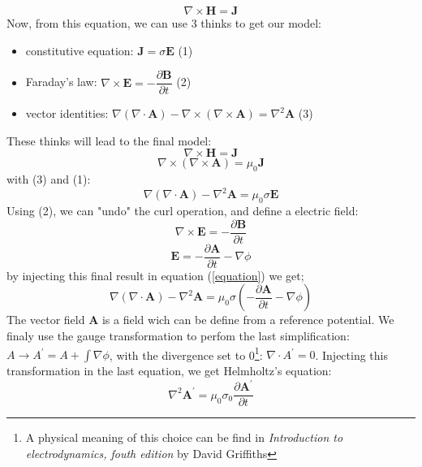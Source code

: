 \begin{equation}
    \boxed{\nabla \times \textbf{H} = \textbf{J}}
\end{equation}
Now, from this equation, we can use 3 thinks to get our model:
\begin{itemize}
    \item constitutive equation: $\textbf{J} = \sigma \textbf{E}$ (1)
    \item Faraday's law: $\nabla \times \textbf{E} = -\dfrac{\partial \textbf{B}}{\partial t}$ (2)
    \item vector identities: $\nabla(\nabla \cdot \textbf{A})-\nabla \times (\nabla \times \textbf{A}) = \nabla^{2}\textbf{A}$  (3)
\end{itemize}
These thinks will lead to the final model:
\begin{equation}
    \nabla \times \textbf{H} = \textbf{J}
\end{equation}
\begin{equation}
    \nabla \times (\nabla \times \textbf{A}) = \mu_{0}\textbf{J}
\end{equation}
with (3) and (1):
\begin{equation}\label{equation}
    \nabla(\nabla \cdot \textbf{A})- \nabla^{2}\textbf{A} = \mu_{0}\sigma\textbf{E}
\end{equation}
Using (2), we can "undo" the curl operation, and define a electric field:
\begin{equation}
    \nabla \times \textbf{E} = -\dfrac{\partial \textbf{B}}{\partial t}
\end{equation}
\begin{equation}
    \textbf{E} = -\dfrac{\partial \textbf{A}}{\partial t} - \nabla\phi
\end{equation}
by injecting this final result in equation (\ref{equation}) we get;
\begin{equation}
    \nabla(\nabla \cdot \textbf{A})- \nabla^{2}\textbf{A} = \mu_{0}\sigma\left(-\dfrac{\partial \textbf{A}}{\partial t} - \nabla\phi\right)
\end{equation}
The vector field $\textbf{A}$ is a field wich can be define from a reference potential. We finaly use the gauge transformation to perfom the last simplification: $A \longrightarrow A^{'} = A + \int \nabla \phi$, with the divergence set to 0\footnote{A physical meaning of this choice can be find in \textit{Introduction to electrodynamics, fouth edition} by David Griffiths}: $\nabla \cdot A^{'}=0$. Injecting this transformation in the last equation, we get Helmholtz's equation:
\begin{equation}
    \boxed{\nabla^{2}\textbf{A}^{'}=\mu_{0}\sigma_{0}\dfrac{\partial \textbf{A}^{'}}{\partial t}}
\end{equation}



